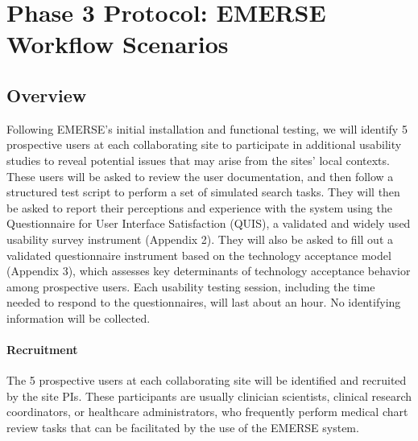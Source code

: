 
\chapter{Phase 3 Protocol: EMERSE Workflow Scenarios}

\section{Overview}
Following EMERSE’s initial installation and functional testing, we will identify 5 prospective users at each collaborating site to participate in additional usability studies to reveal potential issues that may arise from the sites’ local contexts. These users will be asked to review the user documentation, and then follow a structured test script to perform a set of simulated search tasks. They will then be asked to report their perceptions and experience with the system using the Questionnaire for User Interface Satisfaction (QUIS), a validated and widely used usability survey instrument (Appendix 2). They will also be asked to fill out a validated questionnaire instrument based on the technology acceptance model (Appendix 3), which assesses key determinants of technology acceptance behavior among prospective users. Each usability testing session, including the time needed to respond to the questionnaires, will last about an hour. No identifying information will be collected.
\subsubsection{Recruitment}
The 5 prospective users at each collaborating site will be identified and recruited by the site PIs. These participants are usually clinician scientists, clinical research coordinators, or healthcare administrators, who frequently perform medical chart review tasks that can be facilitated by the use of the EMERSE system.

